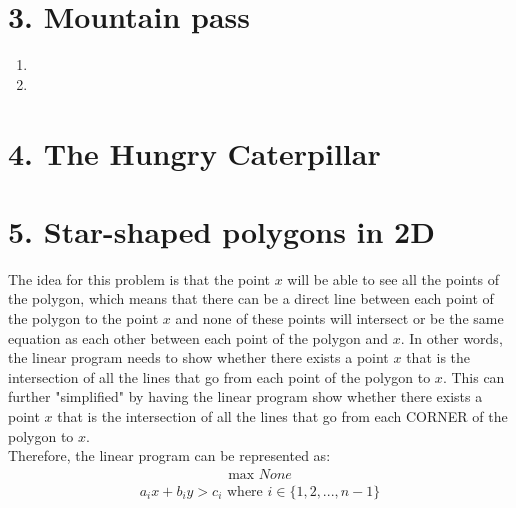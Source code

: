 \documentclass[11pt]{article}
\begin{document}
\newpage
\section*{3. Mountain pass}
\begin{enumerate}[label=(\alph*)]
\item




\item






\end{enumerate}



\newpage
\section*{4. The Hungry Caterpillar}




\newpage
\section*{5. Star-shaped polygons in 2D}
\vspace*{1\baselineskip}
The idea for this problem is that the point $x$ will be able to see all the points of the polygon, which means that there can be a direct line between each point of the polygon to the point $x$ and none of these points will intersect or be the same equation as each other between each point of the polygon and $x$. In other words, the linear program needs to show whether there exists a point $x$ that is the intersection of all the lines that go from each point of the polygon to $x$. This can further "simplified" by having the linear program show whether there exists a point $x$ that is the intersection of all the lines that go from each CORNER of the polygon to $x$. \\
\vspace*{1\baselineskip}
Therefore, the linear program can be represented as:
\begin{align*}
\text{max } None
\end{align*}
\begin{align*}
a_i x + b_i y > c_i \text{ where } i \in \{1, 2, ..., n - 1\}
\end{align*}



\newpage
\end{document}
